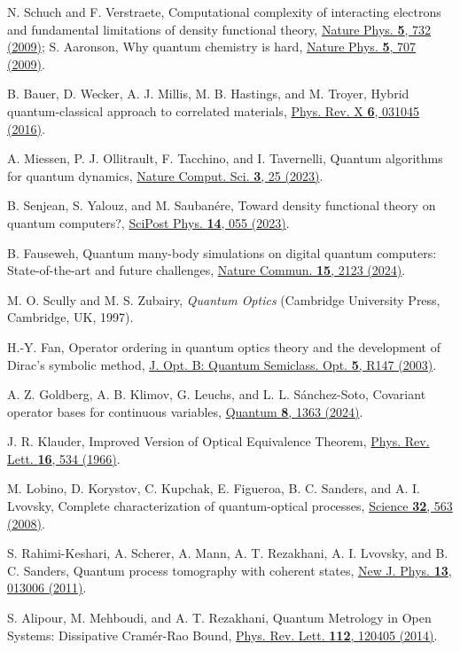 \documentclass[aps,pra,twocolumn,floatfix,groupedaddress,superscriptaddress,nofootinbib,notitlepage]{revtex4-2}
\begin{document}
\begin{thebibliography}{100}
 N. Schuch and F. Verstraete, Computational complexity of interacting electrons and fundamental limitations of density functional theory, \href{https://doi.org/10.1038/nphys1370}{Nature Phys. \textbf{5}, 732 (2009)}; S. Aaronson, Why quantum chemistry is hard, \href{https://doi.org/10.1038/nphys1415}{Nature Phys. \textbf{5}, 707 (2009)}.

 B. Bauer, D. Wecker, A. J. Millis, M. B. Hastings, and M. Troyer, Hybrid quantum-classical approach to correlated materials, \href{https://doi.org/10.1103/PhysRevX.6.031045}{Phys. Rev. X \textbf{6}, 031045 (2016)}.

 A. Miessen, P. J. Ollitrault, F. Tacchino, and I. Tavernelli, Quantum algorithms for quantum dynamics, \href{https://doi.org/10.1038/s43588-022-00374-2}{Nature Comput. Sci. \textbf{3}, 25 (2023)}.

 B. Senjean, S. Yalouz, and M. Sauban\'{e}re, Toward density functional theory on quantum computers?, \href{https://doi.org/10.21468/SciPostPhys.14.3.055}{SciPost Phys. \textbf{14}, 055 (2023)}.

 B. Fauseweh, Quantum many-body simulations on digital quantum computers: State-of-the-art and future challenges, \href{https://doi.org/10.1038/s41467-024-46402-9}{Nature Commun. \textbf{15}, 2123 (2024)}.


 M. O. Scully and M. S. Zubairy, \emph{Quantum Optics} (Cambridge University Press, Cambridge, UK, 1997).

 H.-Y. Fan, Operator ordering in quantum optics theory and the development of Dirac's symbolic method, \href{https://doi.org/10.1088/1464-4266/5/4/201}{J. Opt. B: Quantum Semiclass. Opt. \textbf{5}, R147 (2003)}.

 A. Z. Goldberg, A. B. Klimov, G. Leuchs, and L. L. S\'{a}nchez-Soto, Covariant operator bases for continuous variables, \href{https://doi.org/10.22331/q-2024-05-29-1363}{Quantum \textbf{8}, 1363 (2024)}.

 J. R. Klauder, Improved Version of Optical Equivalence Theorem, \href{https://doi.org/10.1103/PhysRevLett.16.534}{Phys. Rev. Lett. \textbf{16}, 534 (1966)}.

 M. Lobino, D. Korystov, C. Kupchak, E. Figueroa, B. C. Sanders, and A. I. Lvovsky, Complete characterization of quantum-optical processes, \href{https://doi.org/10.1126/science.1162086}{Science \textbf{32}, 563 (2008)}.

 S. Rahimi-Keshari, A. Scherer, A. Mann, A. T. Rezakhani, A. I. Lvovsky, and B. C. Sanders, Quantum process tomography with coherent states, \href{https://doi.org/10.1088/1367-2630/13/1/013006}{New J. Phys. \textbf{13}, 013006 (2011)}.

 S. Alipour, M. Mehboudi, and A. T. Rezakhani, Quantum Metrology in Open Systems: Dissipative Cram\'{e}r-Rao Bound, \href{https://doi.org/10.1103/PhysRevLett.112.120405}{Phys. Rev. Lett. \textbf{112}, 120405 (2014)}.

\end{thebibliography}
\end{document}
